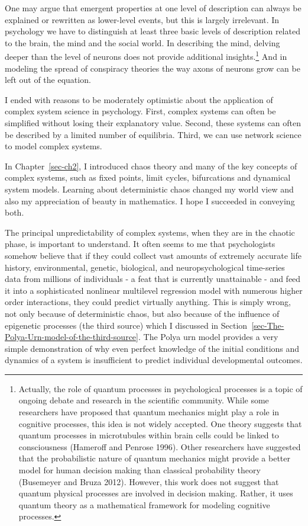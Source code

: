 \documentclass[
  a4paper,
  DIV=11,
  numbers=noendperiod]{scrreprt}
\begin{document}
One may argue that emergent properties at one level of description can
always be explained or rewritten as lower-level events, but this is
largely irrelevant. In psychology we have to distinguish at least three
basic levels of description related to the brain, the mind and the
social world. In describing the mind, delving deeper than the level of
neurons does not provide additional insights.\footnote{Actually, the
  role of quantum processes in psychological processes is a topic of
  ongoing debate and research in the scientific community. While some
  researchers have proposed that quantum mechanics might play a role in
  cognitive processes, this idea is not widely accepted. One theory
  suggests that quantum processes in microtubules within brain cells
  could be linked to consciousness (Hameroff and Penrose 1996). Other
  researchers have suggested that the probabilistic nature of quantum
  mechanics might provide a better model for human decision making than
  classical probability theory (Busemeyer and Bruza 2012). However, this
  work does not suggest that quantum physical processes are involved in
  decision making. Rather, it uses quantum theory as a mathematical
  framework for modeling cognitive processes.} And in modeling the
spread of conspiracy theories the way axons of neurons grow can be left
out of the equation.

I ended with reasons to be moderately optimistic about the application
of complex system science in psychology. First, complex systems can
often be simplified without losing their explanatory value. Second,
these systems can often be described by a limited number of equilibria.
Third, we can use network science to model complex systems.

In Chapter~\ref{sec-ch2}, I introduced chaos theory and many of the key
concepts of complex systems, such as fixed points, limit cycles,
bifurcations and dynamical system models. Learning about deterministic
chaos changed my world view and also my appreciation of beauty in
mathematics. I hope I succeeded in conveying both.

The principal unpredictability of complex systems, when they are in the
chaotic phase, is important to understand. It often seems to me that
psychologists somehow believe that if they could collect vast amounts of
extremely accurate life history, environmental, genetic, biological, and
neuropsychological time-series data from millions of individuals - a
feat that is currently unattainable - and feed it into a sophisticated
nonlinear multilevel regression model with numerous higher order
interactions, they could predict virtually anything. This is simply
wrong, not only because of deterministic chaos, but also because of the
influence of epigenetic processes (the third source) which I discussed
in Section~\ref{sec-The-Polya-Urn-model-of-the-third-source}. The Polya
urn model provides a very simple demonstration of why even perfect
knowledge of the initial conditions and dynamics of a system is
insufficient to predict individual developmental outcomes.
\end{document}
